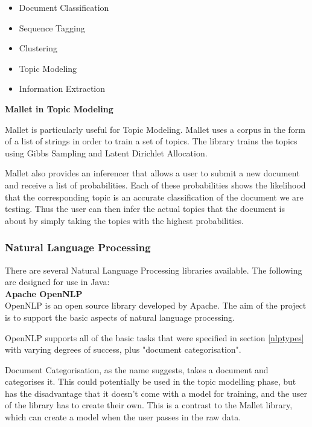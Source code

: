 \documentclass[12pt]{article}
\begin{document}
\begin{itemize}
	\item Document Classification
	\item Sequence Tagging
	\item Clustering
	\item Topic Modeling
	\item Information Extraction \\
\end{itemize}

\textbf{Mallet in Topic Modeling}

Mallet is particularly useful for Topic Modeling. Mallet uses a corpus in the form of a list of strings in order to train a set of topics. The library trains the topics using Gibbs Sampling and Latent Dirichlet Allocation.

Mallet also provides an inferencer that allows a user to submit a new document and receive a list of probabilities. Each of these probabilities shows the likelihood that the corresponding topic is an accurate classification of the document we are testing. Thus the user can then infer the actual topics that the document is about by simply taking the topics with the highest probabilities. 
 

\subsubsection{Natural Language Processing}

There are several Natural Language Processing libraries available. The following are designed for use in Java: \\

\textbf{Apache OpenNLP} \\

OpenNLP is an open source library developed by Apache. The aim of the project is to support the basic aspects of natural language processing.

OpenNLP supports all of the basic tasks that were specified in section \ref{nlptypes} with varying degrees of success, plus "document categorisation".

Document Categorisation, as the name suggests, takes a document and categorises it. This could potentially be used in the topic modelling phase, but has the disadvantage that it doesn't come with a model for training, and the user of the library has to create their own. This is a contrast to the Mallet library, which can create a model when the user passes in the raw data.
\end{document}
